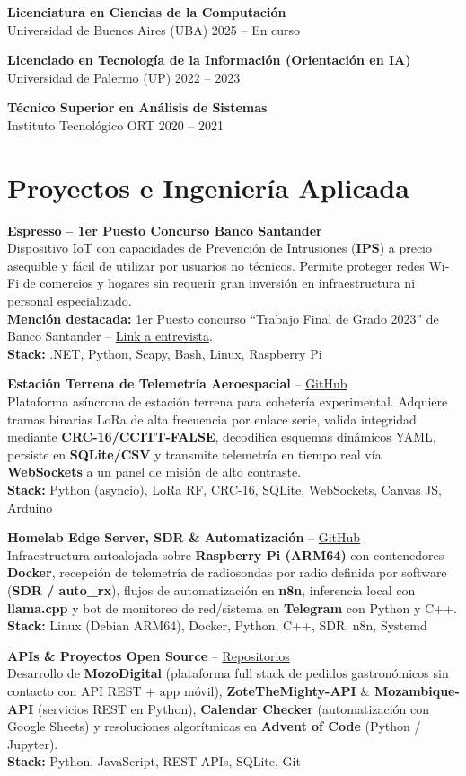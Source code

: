 \documentclass[10pt,a4paper]{article}
\newcommand{\cvedu}[3]{
  {\small\bfseries\color{darktext}#1}\\[1pt]
  {\footnotesize\color{primary}#2} \hfill {\footnotesize\color{mutedtext}#3}\vspace{4pt}
}
\newcommand{\cvproject}[4]{
  {\small\bfseries\color{darktext}#1} {\footnotesize #2}\\[1.5pt]
  {\footnotesize\color{darktext}#3}\\[1.5pt]
  {\footnotesize\textbf{\color{primary}Stack:} \color{mutedtext}#4}\vspace{5pt}
}
\begin{document}
\begin{minipage}[t]{11.9cm}
\cvedu{Licenciatura en Ciencias de la Computación}{Universidad de Buenos Aires (UBA)}{2025 -- En curso}

\cvedu{Licenciado en Tecnología de la Información (Orientación en IA)}{Universidad de Palermo (UP)}{2022 -- 2023}

\cvedu{Técnico Superior en Análisis de Sistemas}{Instituto Tecnológico ORT}{2020 -- 2021}

\section{Proyectos e Ingeniería Aplicada}

\cvproject{Espresso}{\textcolor{accent}{\textbf{-- 1er Puesto Concurso Banco Santander}}}{
  Dispositivo IoT con capacidades de Prevención de Intrusiones (\textbf{IPS}) a precio asequible y fácil de utilizar por usuarios no técnicos. Permite proteger redes Wi-Fi de comercios y hogares sin requerir gran inversión en infraestructura ni personal especializado.\\
  \textbf{Mención destacada:} 1er Puesto concurso ``Trabajo Final de Grado 2023'' de Banco Santander -- \href{https://www.palermo.edu/ingenieria/alumnos-protagonistas/matias-picon.html}{Link a entrevista}.
}{.NET, Python, Scapy, Bash, Linux, Raspberry Pi}

\cvproject{Estación Terrena de Telemetría Aeroespacial}{-- \href{https://github.com/Invenciones-Espaciales/estacion-terrena-pc}{GitHub}}{
  Plataforma asíncrona de estación terrena para cohetería experimental. Adquiere tramas binarias LoRa de alta frecuencia por enlace serie, valida integridad mediante \textbf{CRC-16/CCITT-FALSE}, decodifica esquemas dinámicos YAML, persiste en \textbf{SQLite/CSV} y transmite telemetría en tiempo real vía \textbf{WebSockets} a un panel de misión de alto contraste.
}{Python (asyncio), LoRa RF, CRC-16, SQLite, WebSockets, Canvas JS, Arduino}

\cvproject{Homelab Edge Server, SDR \& Automatización}{-- \href{https://github.com/x7reme13}{GitHub}}{
  Infraestructura autoalojada sobre \textbf{Raspberry Pi (ARM64)} con contenedores \textbf{Docker}, recepción de telemetría de radiosondas por radio definida por software (\textbf{SDR / auto\_rx}), flujos de automatización en \textbf{n8n}, inferencia local con \textbf{llama.cpp} y bot de monitoreo de red/sistema en \textbf{Telegram} con Python y C++.
}{Linux (Debian ARM64), Docker, Python, C++, SDR, n8n, Systemd}

\cvproject{APIs \& Proyectos Open Source}{-- \href{https://github.com/x7reme13?tab=repositories}{Repositorios}}{
  Desarrollo de \textbf{MozoDigital} (plataforma full stack de pedidos gastronómicos sin contacto con API REST + app móvil), \textbf{ZoteTheMighty-API} \& \textbf{Mozambique-API} (servicios REST en Python), \textbf{Calendar Checker} (automatización con Google Sheets) y resoluciones algorítmicas en \textbf{Advent of Code} (Python / Jupyter).
}{Python, JavaScript, REST APIs, SQLite, Git}

\end{minipage}%
\end{document}
